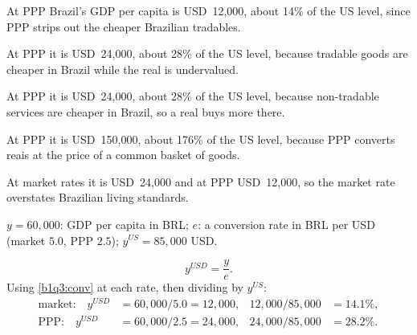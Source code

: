 \begin{alternativas}
\item At PPP Brazil's GDP per capita is USD~12{,}000, about 14\% of the US level, since PPP strips out the cheaper Brazilian tradables.
\item At PPP it is USD~24{,}000, about 28\% of the US level, because tradable goods are cheaper in Brazil while the real is undervalued.
\item At PPP it is USD~24{,}000, about 28\% of the US level, because non-tradable services are cheaper in Brazil, so a real buys more there.
\item At PPP it is USD~150{,}000, about 176\% of the US level, because PPP converts reais at the price of a common basket of goods.
\item At market rates it is USD~24{,}000 and at PPP USD~12{,}000, so the market rate overstates Brazilian living standards.
\end{alternativas}
\begin{sol}
\begin{notacao}
\item $y=60{,}000$: GDP per capita in BRL; $e$: a conversion rate in BRL per USD (market $5.0$, PPP $2.5$); $y^{US}=85{,}000$ USD.
\end{notacao}
\begin{equation}
y^{USD}=\frac{y}{e}. \label{b1q3:conv}
\end{equation}
Using \eqref{b1q3:conv} at each rate, then dividing by $y^{US}$:
\begin{align*}
\text{market:}\quad y^{USD}&=60{,}000/5.0=12{,}000, & 12{,}000/85{,}000&=14.1\%,\\
\text{PPP:}\quad y^{USD}&=60{,}000/2.5=24{,}000, & 24{,}000/85{,}000&=28.2\%.
\end{align*}
\end{sol}
